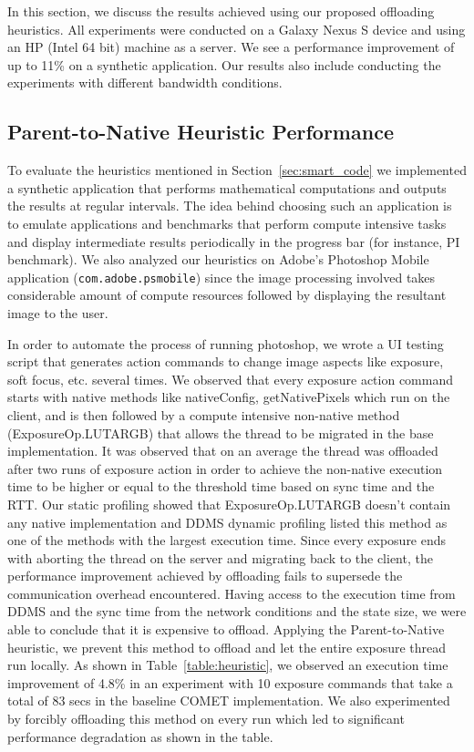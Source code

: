 In this section, we discuss the results achieved using our proposed offloading heuristics.
All experiments were conducted on a Galaxy Nexus S device and using an HP (Intel 64 bit) machine as a server.
We see a performance improvement
of up to 11\% on a synthetic application. Our results also include conducting the experiments with different bandwidth conditions.
\subsection{Parent-to-Native Heuristic Performance}
To evaluate the heuristics mentioned in Section~\ref{sec:smart_code} we implemented a synthetic application that performs mathematical computations and outputs the results at regular intervals. The idea behind choosing such an application is to emulate applications and benchmarks that perform compute intensive tasks and display intermediate results periodically in the progress bar (for instance, PI benchmark). We also analyzed our heuristics on Adobe's Photoshop Mobile application
(\texttt{com.adobe.psmobile}) since the image processing involved takes considerable amount of compute resources followed by displaying the resultant image to the user.

In order to automate the process of running photoshop, we wrote a UI testing script that generates action commands to change image aspects like exposure, soft focus, etc. several times. We observed that every exposure action command starts with native methods like nativeConfig, getNativePixels which run on the client, and is then followed by a compute intensive non-native method  (ExposureOp.LUTARGB) that allows the thread to be migrated in the base implementation. It was observed that on an average the thread was offloaded after two runs of exposure action in order to achieve the non-native execution time to be higher or equal to the threshold time based on sync time and the RTT. Our static profiling showed that ExposureOp.LUTARGB doesn't contain any native implementation and DDMS dynamic profiling listed this method as one of the methods with the largest execution time. Since every exposure ends with aborting the thread on the server and migrating back to the client, the performance improvement achieved by offloading fails to supersede the communication overhead encountered. Having access to the execution time from DDMS and the sync time from the network conditions and the state size, we were able to conclude that it is expensive to offload. Applying the Parent-to-Native heuristic, we prevent this method to offload and let the entire exposure thread run locally. As shown in Table~\ref{table:heuristic}, we observed an execution time improvement of 4.8\% in an experiment with 10 exposure commands that take a total of 83 secs in the baseline COMET implementation.  We also experimented by forcibly offloading this method on every run which led to significant performance degradation as shown in the table.

